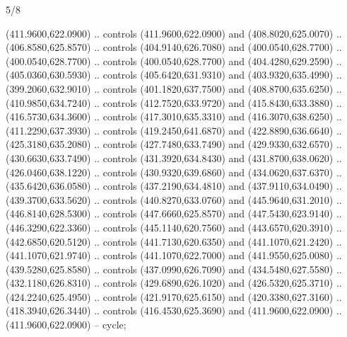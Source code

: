 \begin{flagdescription}{5/8}
\begin{scope}[shift={(m)}]
\begin{scope}[scale=\flagwidth/220,y=0.1mm, x=0.1mm, yscale=-1,shift={(-596,-360)}]
\begin{scope}[cm={{-1.0,0.0,0.0,1.0,(1193.9797,0.0)}}]
\begin{scope}[draw=black,line join=round,line cap=round,line width=0.381\lw]
\begin{scope}[line width=0.534\lw,fill=green]
 (411.9600,622.0900) .. controls (411.9600,622.0900) and
  (408.8020,625.0070) .. (406.8580,625.8570) .. controls (404.9140,626.7080) and
  (400.0540,628.7700) .. (400.0540,628.7700) .. controls (400.0540,628.7700) and
  (404.4280,629.2590) .. (405.0360,630.5930) .. controls (405.6420,631.9310) and
  (403.9320,635.4990) .. (399.2060,632.9010) .. controls (401.1820,637.7500) and
  (408.8700,635.6250) .. (410.9850,634.7240) .. controls (412.7520,633.9720) and
  (415.8430,633.3880) .. (416.5730,634.3600) .. controls (417.3010,635.3310) and
  (416.3070,638.6250) .. (411.2290,637.3930) .. controls (419.2450,641.6870) and
  (422.8890,636.6640) .. (425.3180,635.2080) .. controls (427.7480,633.7490) and
  (429.9330,632.6570) .. (430.6630,633.7490) .. controls (431.3920,634.8430) and
  (431.8700,638.0620) .. (426.0460,638.1220) .. controls (430.9320,639.6860) and
  (434.0620,637.6370) .. (435.6420,636.0580) .. controls (437.2190,634.4810) and
  (437.9110,634.0490) .. (439.3700,633.5620) .. controls (440.8270,633.0760) and
  (445.9640,631.2010) .. (446.8140,628.5300) .. controls (447.6660,625.8570) and
  (447.5430,623.9140) .. (446.3290,622.3360) .. controls (445.1140,620.7560) and
  (443.6570,620.3910) .. (442.6850,620.5120) .. controls (441.7130,620.6350) and
  (441.1070,621.2420) .. (441.1070,621.9740) .. controls (441.1070,622.7000) and
  (441.9550,625.0080) .. (439.5280,625.8580) .. controls (437.0990,626.7090) and
  (434.5480,627.5580) .. (432.1180,626.8310) .. controls (429.6890,626.1020) and
  (426.5320,625.3710) .. (424.2240,625.4950) .. controls (421.9170,625.6150) and
  (420.3380,627.3160) .. (418.3940,626.3440) .. controls (416.4530,625.3690) and
  (411.9600,622.0900) .. (411.9600,622.0900) -- cycle;


\end{scope}
\end{scope}
\end{scope}
\end{scope}
\end{scope}
\end{flagdescription}
